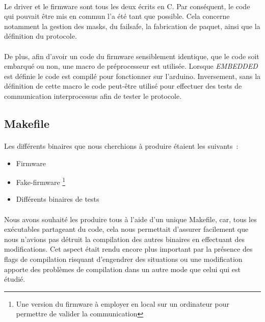 \paragraph{}
Le driver et le firmware sont tous les deux écrits en C. Par conséquent, le
code qui pouvait être mis en commun l'a été tant que possible. Cela concerne
notamment la gestion des masks, du failsafe, la fabrication de paquet, ainsi
que la définition du protocole.

\paragraph{}
De plus, afin d'avoir un code du firmware sensiblement identique, que le code
soit embarqué ou non, une macro de préprocesseur est utilisée. Lorsque
\emph{EMBEDDED} est définie le code est compilé pour fonctionner sur
l'arduino. Inversement, sans la définition de cette macro le code peut-être
utilisé pour effectuer des tests de communication interprocessus afin de
tester le protocole.


\subsection{Makefile}
\paragraph{}
Les différents binaires que nous cherchions à produire étaient les suivants~:
\begin{itemize}
\item Firmware
\item Fake-firmware
      \footnote{Une version du firmware à employer en local sur un ordinateur
                pour permettre de valider la communication}
\item Différents binaires de tests
\end{itemize}

\paragraph{}
Nous avons souhaité les produire tous à l'aide d'un unique Makefile, car, tous
les exécutables partageant du code, cela nous permettait d'assurer facilement
que nous n'avions pas détruit la compilation des autres binaires en effectuant
des modifications. Cet aspect était rendu encore plus important par la présence
des flags de compilation risquant d'engendrer des situations ou une modification
apporte des problèmes de compilation dans un autre mode que celui qui est
étudié.

